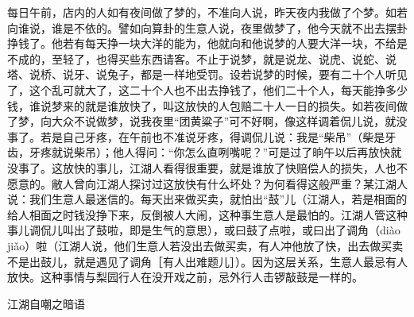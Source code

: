 \documentclass[12pt,UTF8]{ctexbook}
\begin{document}
每日午前，店内的人如有夜间做了梦的，不准向人说，昨天夜内我做了个梦。如若向谁说，谁是不依的。譬如向算卦的生意人说，夜里做梦了，他今天就不出去摆卦挣钱了。他若有每天挣一块大洋的能为，他就向和他说梦的人要大洋一块，不给是不成的，至轻了，也得买些东西请客。不止于说梦，就是说龙、说虎、说蛇、说塔、说桥、说牙、说兔子，都是一样地受罚。设若说梦的时候，要有二十个人听见了，这个乱可就大了，这二十个人也不出去挣钱了，他们二十个人，每天能挣多少钱，谁说梦来的就是谁放快了，叫这放快的人包赔二十人一日的损失。如若夜间做了梦，向大众不说做梦，说我夜里“团黄粱子”可不好啊，像这样调着侃儿说，就没事了。若是自己牙疼，在午前也不准说牙疼，得调侃儿说：我是“柴吊”（柴是牙齿，牙疼就说柴吊）；他人得问：“你怎么直咧嘴呢？”可是过了晌午以后再放快就没事了。这放快的事儿，江湖人看得很重要，就是谁放了快赔偿人的损失，人也不愿意的。敝人曾向江湖人探讨过这放快有什么坏处？为何看得这般严重？某江湖人说：我们生意人最迷信的。每天出来做买卖，就怕出“鼓”儿（江湖人，若是相面的给人相面之时钱没挣下来，反倒被人大闹，这种事生意人是最怕的。江湖人管这种事儿调侃儿叫出了鼓啦，即是生气的意思），或曰鼓了点啦，或曰出了调角（diào jiǎo）啦（江湖人说，他们生意人若没出去做买卖，有人冲他放了快，出去做买卖不是出鼓儿，就是遇见了调角［有人出难题儿］）。因为这层关系，生意人最忌有人放快。这种事情与梨园行人在没开戏之前，忌外行人击锣敲鼓是一样的。





江湖自嘲之暗语
\end{document}
